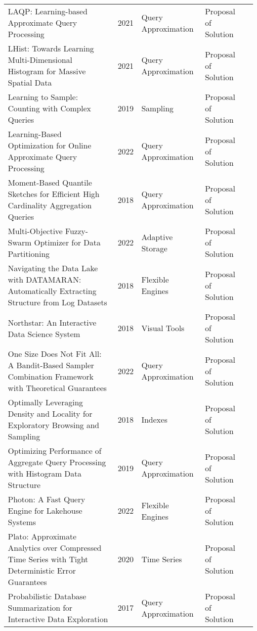 \begin{longtable}{p{18em} l l l l}
{{LAQP}}: {{Learning-based}} Approximate Query Processing & 2021 & Query Approximation & Proposal of Solution & \cite{zhang_laqp_2021}\\ 
{{LHist}}: {{Towards}} Learning Multi-Dimensional Histogram for Massive Spatial Data & 2021 & Query Approximation & Proposal of Solution & \cite{liu_lhist_2021}\\ 
Learning to Sample: {{Counting}} with Complex Queries & 2019 & Sampling & Proposal of Solution & \cite{walenz_learning_2019}\\ 
Learning-{{Based Optimization}} for {{Online Approximate Query Processing}} & 2022 & Query Approximation & Proposal of Solution & \cite{bi_learningbased_2022}\\ 
Moment-Based Quantile Sketches for Efficient High Cardinality Aggregation Queries & 2018 & Query Approximation & Proposal of Solution & \cite{gan_momentbased_2018}\\ 
Multi-Objective {{Fuzzy-Swarm Optimizer}} for {{Data Partitioning}} & 2022 & Adaptive Storage & Proposal of Solution & \cite{goyal_multiobjective_2022}\\ 
Navigating the Data Lake with {{DATAMARAN}}: {{Automatically}} Extracting Structure from Log Datasets & 2018 & Flexible Engines & Proposal of Solution & \cite{gao_navigating_2018}\\ 
Northstar: {{An}} Interactive Data Science System & 2018 & Visual Tools & Proposal of Solution & \cite{kraska_northstar_2018}\\ 
One Size Does Not Fit All: {{A}} Bandit-Based Sampler Combination Framework with Theoretical Guarantees & 2022 & Query Approximation & Proposal of Solution & \cite{peng_one_2022}\\ 
Optimally Leveraging Density and Locality for Exploratory Browsing and Sampling & 2018 & Indexes & Proposal of Solution & \cite{kim_optimally_2018}\\ 
Optimizing {{Performance}} of {{Aggregate Query Processing}} with {{Histogram Data Structure}} & 2019 & Query Approximation & Proposal of Solution & \cite{yong_optimizing_2019}\\ 
Photon: {{A}} Fast Query Engine for Lakehouse Systems & 2022 & Flexible Engines & Proposal of Solution & \cite{behm_photon_2022}\\ 
Plato: {{Approximate}} Analytics over Compressed Time Series with Tight Deterministic Error Guarantees & 2020 & Time Series & Proposal of Solution & \cite{lin_plato_2020}\\ 
Probabilistic Database Summarization for Interactive Data Exploration & 2017 & Query Approximation & Proposal of Solution & \cite{orr_probabilistic_2017}\\ 

\end{longtable}
